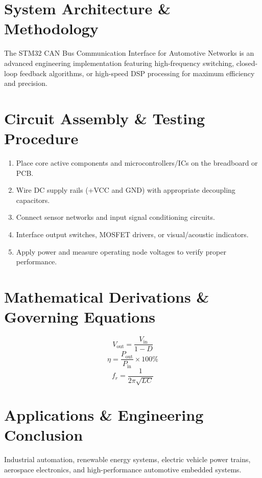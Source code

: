 \documentclass[11pt,a4paper]{article}
\begin{document}
\section{System Architecture \& Methodology}
The STM32 CAN Bus Communication Interface for Automotive Networks is an advanced engineering implementation featuring high-frequency switching, closed-loop feedback algorithms, or high-speed DSP processing for maximum efficiency and precision.

\section{Circuit Assembly \& Testing Procedure}
\begin{enumerate}
    \item Place core active components and microcontrollers/ICs on the breadboard or PCB.
    \item Wire DC supply rails (+VCC and GND) with appropriate decoupling capacitors.
    \item Connect sensor networks and input signal conditioning circuits.
    \item Interface output switches, MOSFET drivers, or visual/acoustic indicators.
    \item Apply power and measure operating node voltages to verify proper performance.
\end{enumerate}

\section{Mathematical Derivations \& Governing Equations}
\begin{equation}
V_{\text{out}} = \frac{V_{\text{in}}}{1 - D}
\end{equation}
\begin{equation}
\eta = \frac{P_{\text{out}}}{P_{\text{in}}} \times 100\%
\end{equation}
\begin{equation}
f_r = \frac{1}{2\pi \sqrt{L C}}
\end{equation}

\section{Applications \& Engineering Conclusion}
Industrial automation, renewable energy systems, electric vehicle power trains, aerospace electronics, and high-performance automotive embedded systems.
\end{document}
